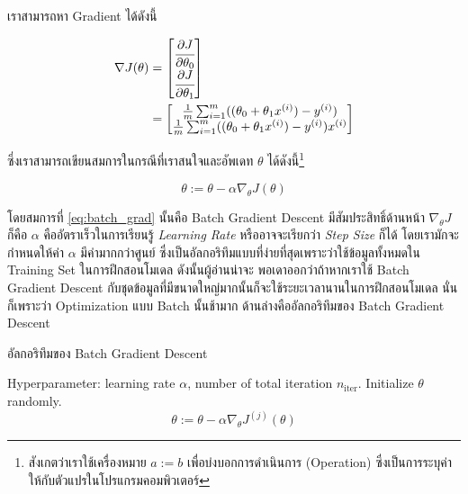 \noindent เราสามารถหา Gradient ได้ดังนี้

\begin{align}
    \nabla J (\theta) & = \begin{bmatrix} \cfrac{\partial J}{\partial \theta_0} \\ \cfrac{\partial J}{\partial
                                  \theta_1}\end{bmatrix}                 \\
                      & =  \begin{bmatrix} \frac{1}{m} \sum_{i=1}^{m} ((\theta_0 + \theta_1 x^{(i)}) - y^{(i)}) \\ \frac{1}{m}
                               \sum_{i=1}^{m} ((\theta_0 + \theta_1 x^{(i)}) - y^{(i)})x^{(i)}\end{bmatrix}
\end{align}

\noindent ซึ่งเราสามารถเขียนสมการในกรณีที่เราสนใจและอัพเดท $\theta$ ได้ดังนี้\footnote{สังเกตว่าเราใช้เครื่องหมาย $a := b$
    เพื่อบ่งบอกการดำเนินการ (Operation) ซึ่งเป็นการระบุค่าให้กับตัวแปรในโปรแกรมคอมพิวเตอร์}

\begin{equation}\label{eq:batch_grad}
    \theta := \theta - \alpha\nabla_\theta J(\theta)
\end{equation}

\noindent โดยสมการที่ \eqref{eq:batch_grad} นั้นคือ Batch Gradient Descent มีสัมประสิทธิ์ด้านหน้า $\nabla_\theta J$ ก็คือ
$\alpha$ คืออัตราเร็วในการเรียนรู้ \textit{Learning Rate} หรืออาจจะเรียกว่า \textit{Step Size} ก็ได้ โดยเรามักจะกำหนดให้ค่า
$\alpha$ มีค่ามากกว่าศูนย์ ซึ่งเป็นอัลกอริทึมแบบที่ง่ายที่สุดเพราะว่าใช้ข้อมูลทั้งหมดใน Training Set ในการฝึกสอนโมเดล ดังนั้นผู้อ่านน่าจะ%
พอเดาออกว่าถ้าหากเราใช้ Batch Gradient Descent กับชุดข้อมูลที่มีขนาดใหญ่มากนั้นก็จะใช้ระยะเวลานานในการฝึกสอนโมเดล นั่นก็เพราะว่า
Optimization แบบ Batch นั้นช้ามาก ด้านล่างคืออัลกอริทึมของ Batch Gradient Descent

\begin{algorithm}[H]
    \caption{อัลกอริทึมของ Batch Gradient Descent}
    \label{alg:batch_grad}
    \begin{algorithmic}
        \State Hyperparameter: learning rate $\alpha$, number of total iteration $n_\text{iter}$.
        \State Initialize $\theta$ randomly.
        \begin{equation*}
            \theta := \theta - \alpha\nabla_\theta J^{(j)}(\theta)
        \end{equation*}
        \EndFor
    \end{algorithmic}
\end{algorithm}

